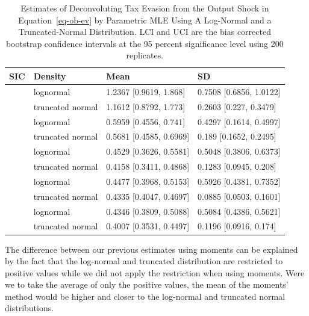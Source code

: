 \documentclass[
  12pt]{article}
\theoremstyle{definition}
\theoremstyle{remark}
\begin{document}
\begin{longtable}[t]{llll}

\caption{\label{tbl-deconv-mle-boot}Estimates of Deconvoluting Tax
Evasion from the Output Shock in Equation~\ref{eq-ob-ev} by Parametric
MLE Using A Log-Normal and a Truncated-Normal Distribution. LCI and UCI
are the bias corrected bootstrap confidence intervals at the 95 percent
significance level using 200 replicates.}

\tabularnewline

\toprule
SIC & Density & Mean & SD\\
\midrule
 & lognormal & 1.2367 [0.9619, 1.868] & 0.7508 [0.6856, 1.0122]\\
\cmidrule{2-4}\nopagebreak
\multirow[t]{-2}{*}{\raggedright\arraybackslash 322} & truncated normal & 1.1612 [0.8792, 1.773] & 0.2603 [0.227, 0.3479]\\
\cmidrule{1-4}\pagebreak[0]
 & lognormal & 0.5959 [0.4556, 0.741] & 0.4297 [0.1614, 0.4997]\\
\cmidrule{2-4}\nopagebreak
\multirow[t]{-2}{*}{\raggedright\arraybackslash 351} & truncated normal & 0.5681 [0.4585, 0.6969] & 0.189 [0.1652, 0.2495]\\
\cmidrule{1-4}\pagebreak[0]
 & lognormal & 0.4529 [0.3626, 0.5581] & 0.5048 [0.3806, 0.6373]\\
\cmidrule{2-4}\nopagebreak
\multirow[t]{-2}{*}{\raggedright\arraybackslash 331} & truncated normal & 0.4158 [0.3411, 0.4868] & 0.1283 [0.0945, 0.208]\\
\cmidrule{1-4}\pagebreak[0]
 & lognormal & 0.4477 [0.3968, 0.5153] & 0.5926 [0.4381, 0.7352]\\
\cmidrule{2-4}\nopagebreak
\multirow[t]{-2}{*}{\raggedright\arraybackslash 313} & truncated normal & 0.4335 [0.4047, 0.4697] & 0.0885 [0.0503, 0.1601]\\
\cmidrule{1-4}\pagebreak[0]
 & lognormal & 0.4346 [0.3809, 0.5088] & 0.5084 [0.4386, 0.5621]\\
\cmidrule{2-4}\nopagebreak
\multirow[t]{-2}{*}{\raggedright\arraybackslash 342} & truncated normal & 0.4007 [0.3531, 0.4497] & 0.1196 [0.0916, 0.174]\\
\bottomrule

\end{longtable}

The difference between our previous estimates using moments can be
explained by the fact that the log-normal and truncated distribution are
restricted to positive values while we did not apply the restriction
when using moments. Were we to take the average of only the positive
values, the mean of the moments' method would be higher and closer to
the log-normal and truncated normal distributions.
\end{document}
